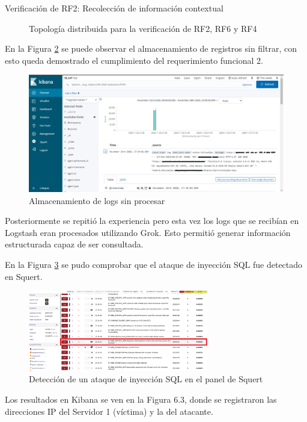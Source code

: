 \begin{section}{Verificación de RF2: Recolección de información contextual}
\begin{figure}[H]
    \caption{Topología distribuida para la verificación de RF2, RF6 y RF4}
    \label{fig:figura_iter2_ataque}
    \end{figure}
    \FloatBarrier

    En la Figura \ref{fig:iter2_logs_crudos} se puede observar el almacenamiento de registros sin filtrar, con esto queda demostrado el cumplimiento del requerimiento funcional 2.
    \begin{figure}[H]
    \centering
    \includegraphics[width=1\textwidth]{./iteracion_2_imagenes/1_kibana_logs_1EDITADA.png}
    \caption{Almacenamiento de logs sin procesar}
    \label{fig:iter2_logs_crudos}
    \end{figure}
    \FloatBarrier
    Posteriormente se repitió la experiencia pero esta vez los logs que se recibían en Logstash eran procesados utilizando Grok. Esto permitió generar información estructurada capaz de ser consultada. \par
    En la Figura \ref{fig:figura_squert-sql} se pudo comprobar que el ataque de inyección SQL fue detectado en Squert.
    \begin{figure}[H]
    \centering
    \includegraphics[width=0.7\textwidth]{./iteracion_2_imagenes/squert-sql-injection.png}
    \caption{Detección de un ataque de inyección SQL en el panel de Squert}
    \label{fig:figura_squert-sql}
    \end{figure}
    Los resultados en Kibana se ven en la Figura 6.3, donde se registraron las direcciones IP del Servidor 1 (víctima) y la del atacante. \par

\end{section}
